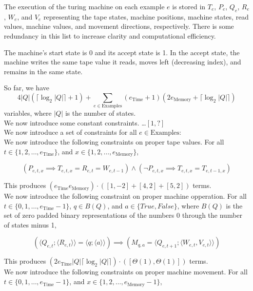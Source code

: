 \documentclass[12pt]{article}
\begin{document}
The execution of the turing machine on each example $e$ is stored in $T_e$, $P_e$, $Q_e$, $R_e$, $W_e$, and $V_e$ representing the tape states, machine positions, machine states, read values, machine values, and movement directions, respectively. There is some redundancy in this list to increase clarity and computational efficiency.

The machine's start state is 0 and its accept state is 1. In the accept state, the machine writes the same tape value it reads, moves left (decreasing index), and remains in the same state.

So far, we have $$4|Q|(\lceil\log_2 |Q|\rceil+1)+\sum_{e\in \text{Examples}} (e_\text{Time}+1)(2e_\text{Memory}+\lceil\log_2 |Q|\rceil)$$
variables, where $|Q|$ is the number of states.\\



We now introduce some constant constraints. \dots $[1,?]$\\


We now introduce a set of constraints for all $e\in\text{Examples}$:\\


We now introduce the following constraints on proper tape values. For all $t\in\{1,2,\dots,e_\text{Time}\}$, and $x\in\{1,2,\dots,e_\text{Memory}\}$,

$$(P_{e,t,x} \implies T_{e,t,x} = R_{e,t} = W_{e,t-1}) \land (\lnot P_{e,t,x} \implies T_{e,t,x} = T_{e,t-1,x})$$

This produces $(e_\text{Time}e_\text{Memory})\cdot([1,-2]+[4,2]+[5,2])$ terms.\\



We now introduce the following constraint on proper machine opperation. For all $t\in\{0,1,\dots,e_\text{Time}-1\}$, $q\in B(Q)$, and $a \in \{True, False\}$, where $B(Q)$ is the set of zero padded binary representations of the numbers 0 through the number of states minus 1,

$$(\langle Q_{e,t};\langle R_{e,t}\rangle\rangle=\langle q;\langle a\rangle\rangle) \implies (M_{q,a} = \langle Q_{e,t+1};\langle W_{e,t},V_{e,t}\rangle\rangle)$$

This produces $(2e_\text{Time}|Q|\lceil\log_2|Q|\rceil)\cdot([\Theta(1),\Theta(1)])$ terms.\\



We now introduce the following constraints on proper machine movement. For all $t\in\{0,1,\dots,e_\text{Time}-1\}$, and $x\in\{1,2,\dots,e_\text{Memory}-1\}$,
\end{document}
